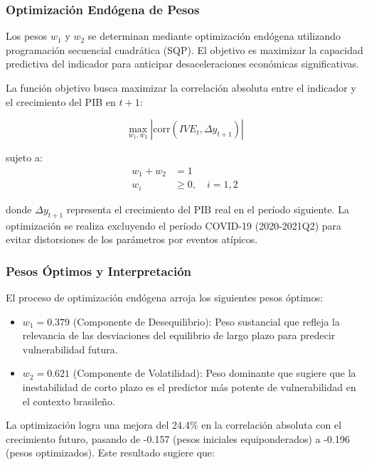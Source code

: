 \documentclass[3p,11pt]{elsarticle}
\begin{document}
\subsubsection{Optimización Endógena de Pesos}

Los pesos $w_1$ y $w_2$ se determinan mediante optimización endógena utilizando programación secuencial cuadrática (SQP). El objetivo es maximizar la capacidad predictiva del indicador para anticipar desaceleraciones económicas significativas.

La función objetivo busca maximizar la correlación absoluta entre el indicador y el crecimiento del PIB en $t+1$:

\begin{equation}
\max_{w_1,w_2} |\text{corr}(IVE_t, \Delta y_{t+1})|
\label{eq:optimizacion}
\end{equation}

sujeto a:
\begin{align}
w_1 + w_2 &= 1 \\
w_i &\geq 0, \quad i = 1,2
\end{align}

donde $\Delta y_{t+1}$ representa el crecimiento del PIB real en el período siguiente. La optimización se realiza excluyendo el período COVID-19 (2020-2021Q2) para evitar distorsiones de los parámetros por eventos atípicos.

\subsubsection{Pesos Óptimos y Interpretación}

El proceso de optimización endógena arroja los siguientes pesos óptimos:

\begin{itemize}
    \item $w_1 = 0.379$ (Componente de Desequilibrio): Peso sustancial que refleja la relevancia de las desviaciones del equilibrio de largo plazo para predecir vulnerabilidad futura.
    \item $w_2 = 0.621$ (Componente de Volatilidad): Peso dominante que sugiere que la inestabilidad de corto plazo es el predictor más potente de vulnerabilidad en el contexto brasileño.
\end{itemize}

La optimización logra una mejora del 24.4\% en la correlación absoluta con el crecimiento futuro, pasando de -0.157 (pesos iniciales equiponderados) a -0.196 (pesos optimizados). Este resultado sugiere que:
\end{document}

